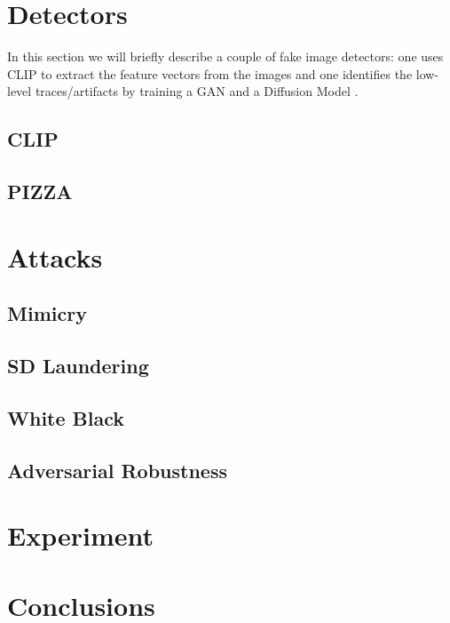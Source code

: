 \documentclass[conference]{IEEEtran} %
\begin{document}
\section{Detectors}

    In this section we will briefly describe a couple of fake image detectors: one uses CLIP to extract the feature vectors from the images \cite{cozzolino2024raising} and one identifies the low-level traces/artifacts by training a GAN and a Diffusion Model \cite{corvi2023detection}.




    \subsection{CLIP}
    \subsection{PIZZA}
\section{Attacks}
    \subsection{Mimicry}
    \subsection{SD Laundering}
    \subsection{White Black}
    \subsection{Adversarial Robustness}
\section{Experiment}
\section{Conclusions}

\end{document}
